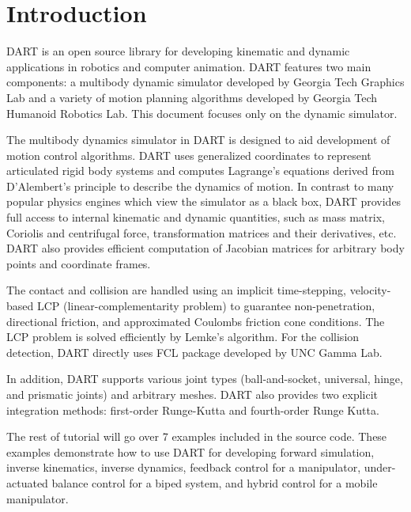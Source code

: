 \section{Introduction}
DART is an open source library for developing kinematic and dynamic
applications in robotics and computer animation. DART features two
main components: a multibody dynamic simulator developed by Georgia
Tech Graphics Lab and a variety of motion planning algorithms
developed by Georgia Tech Humanoid Robotics Lab. This document focuses
only on the dynamic simulator.
 
The multibody dynamics simulator in DART is designed to aid
development of motion control algorithms. DART uses generalized
coordinates to represent articulated rigid body systems and computes
Lagrange’s equations derived from D’Alembert’s principle to describe
the dynamics of motion. In contrast to many popular physics engines
which view the simulator as a black box, DART provides full access to
internal kinematic and dynamic quantities, such as mass matrix,
Coriolis and centrifugal force, transformation matrices and their
derivatives, etc. DART also provides efficient computation of Jacobian
matrices for arbitrary body points and coordinate frames.

The contact and collision are handled using an implicit time-stepping,
velocity-based LCP (linear-complementarity problem) to guarantee
non-penetration, directional friction, and approximated Coulombs
friction cone conditions. The LCP problem is solved efficiently by
Lemke's algorithm. For the collision detection, DART directly uses FCL
package developed by UNC Gamma Lab.

In addition, DART supports various joint types (ball-and-socket,
universal, hinge, and prismatic joints) and arbitrary meshes. DART
also provides two explicit integration methods: first-order
Runge-Kutta and fourth-order Runge Kutta.

The rest of tutorial will go over 7 examples included in the source
code. These examples demonstrate how to use DART for developing
forward simulation, inverse kinematics, inverse dynamics, feedback
control for a manipulator, under-actuated balance control for a biped
system, and hybrid control for a mobile manipulator.
